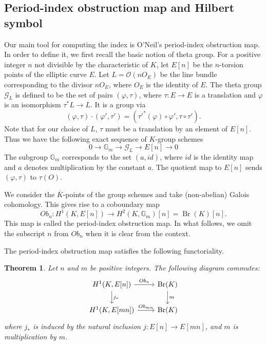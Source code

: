 \documentclass[11pt,a4paper]{amsart}
\newtheorem{theorem}{Theorem}[section]
\theoremstyle{definition}
\newcommand{\Br}{\operatorname{Br}}
\numberwithin{equation}{section}
\begin{document}
\subsection{Period-index obstruction map and Hilbert symbol}
Our main tool for computing the index is O'Neil's period-index obstruction map. In order to define it, we 
first recall the basic notion of theta group. For a positive integer $n$ not divisible by the characteristic of $K$, let $E[n]$ be the $n$-torsion points of the elliptic curve $E$.  Let $L=\mathcal{O}(nO_E)$ be the line bundle corresponding to the divisor $nO_E$, where $O_E$ is the identity of $E$. The theta group $\mathscr{G}_L$ is defined to be the set of pairs $(\varphi,\tau)$, where $\tau: E\rightarrow E$ is a translation and $\varphi $ is an isomorphism $\tau^* L\rightarrow L$. It is a group via
\[
(\varphi,\tau)\cdot(\varphi',\tau')=(\tau'^*(\varphi)\circ\varphi',\tau\circ\tau').
\]
Note that for our choice of $L$, $\tau$ must be a translation by an element of $E[n]$. Thus we have the following  exact sequence of $K$-group schemes
\[
0\rightarrow\mathbb{G}_m\rightarrow \mathscr{G}_L\rightarrow E[n]\rightarrow 0
\]
The subgroup $\mathbb{G}_m$ corresponds to the set $(a,id)$, where $id$ is the identity map and $a$ denotes multiplication by the constant $a$. The quotient map to $E[n]$ sends $(\varphi,\tau)$ to $\tau(O)$.

We consider the \(\overline{K}\)-points of the group schemes and take
(non-abelian) Galois cohomology. This gives rise to a coboundary map
\[
Ob_n:H^1(K,E[n])\longrightarrow H^2(K,\mathbb{G}_m)[n]=\operatorname{Br}(K)[n].
\]
This map is called the period-index obstruction map. In what follows, we
omit the subscript \(n\) from \(Ob_n\) when it is clear from the context.


The period-index obstruction map satisfies the following functoriality.
\begin{theorem}\label{cd}
	Let $n$ and $m$ be positive integers. The following diagram commutes:
	\begin{equation}
		\begin{tikzcd}
		H^1(K,E[n])\ar[r,"Ob_n"]\ar[d,"j_*"]	&\Br(K)\ar[d,"m"] \\
		H^1(K,E[mn])\ar[r,"Ob_{mn}"]	& \Br (K)
		\end{tikzcd}
	\end{equation}
where $j_*$ is induced by the natural inclusion $j:E[n]\rightarrow E[mn] $, and $m$ is multiplication by $m$.
\end{theorem}
\end{document}
